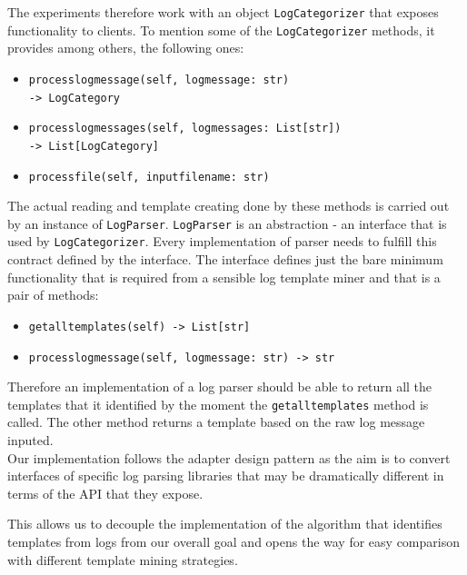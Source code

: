 The experiments therefore work with an object \texttt{LogCategorizer} that exposes functionality to clients. To mention some of the \texttt{LogCategorizer} methods, it provides among others, the following ones:

\begin{itemize}
    \item \texttt{process\textunderscore log\textunderscore message(self, log\textunderscore message: str)\\ -> LogCategory}
    \item \texttt{process\textunderscore log\textunderscore messages(self, log\textunderscore messages: List[str])\\ -> List[LogCategory]}
    \item \texttt{process\textunderscore file(self, input\textunderscore file\textunderscore name: str)}
\end{itemize}

The actual reading and template creating done by these methods is carried out by an instance of \texttt{LogParser}. \texttt{LogParser} is an abstraction - an interface that is used by \texttt{LogCategorizer}. Every implementation of parser needs to fulfill this contract defined by the interface. The interface defines just the bare minimum functionality that is required from a sensible log template miner and that is a pair of methods:
\begin{itemize}
    \item \texttt{get\textunderscore all\textunderscore templates(self) -> List[str]}
    \item \texttt{process\textunderscore log\textunderscore message(self, log\textunderscore message: str) -> str}
\end{itemize}
Therefore an implementation of a log parser should be able to return all the templates that it identified by the moment the \texttt{get\textunderscore all\textunderscore templates} method is called. The other method returns a template based on the raw log message inputed.\\

Our implementation follows the adapter design pattern \cite{gamma1995design_pattern_adapter} as the aim is to convert interfaces of specific log parsing libraries that may be dramatically different in terms of the API that they expose.

This allows us to decouple the implementation of the algorithm that identifies templates from logs from our overall goal and opens the way for easy comparison with different template mining strategies.\\

